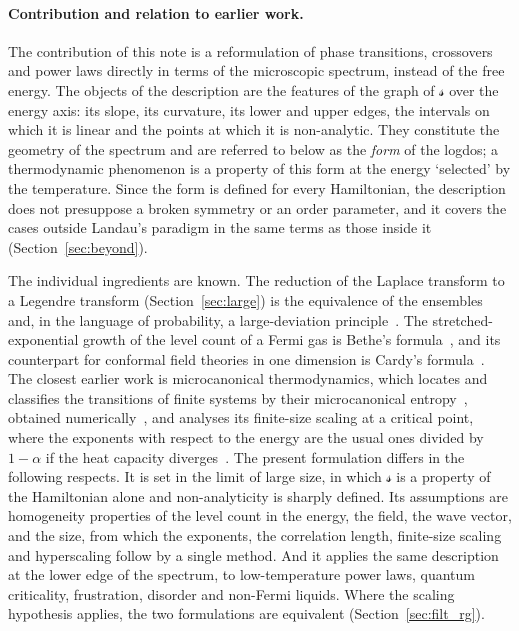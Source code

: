 \documentclass[10pt,a4paper]{article}
\theoremstyle{plain}
\newcommand{\lndos}{{logdos}}  %
\newcommand{\lds}{\mathscr{s}}  %
\begin{document}
\paragraph{Contribution and relation to earlier work.} The contribution of
this note is a reformulation of phase transitions, crossovers and power laws
directly in terms of the microscopic spectrum, instead of the free energy.
The objects of the description are the features of the graph of $\lds$ over
the energy axis: its slope, its curvature, its lower and upper edges, the
intervals on which it is linear and the points at which it is non-analytic.
They constitute the geometry of the spectrum and are referred to below as
the \emph{form} of the \lndos; a
thermodynamic phenomenon is a property of this form at the energy `selected'
by the temperature. Since the form is defined for every Hamiltonian, the
description does not presuppose a broken symmetry or an order parameter, and
it covers the cases outside Landau's paradigm in the same terms as those
inside it (Section~\ref{sec:beyond}).

The individual ingredients are known. The reduction of the Laplace transform
to a Legendre transform (Section~\ref{sec:large}) is the equivalence of the
ensembles~\cite{Schwabl,Ruelle} and, in the language of probability, a
large-deviation principle~\cite{Touchette2009}. The stretched-exponential
growth of the level count of a Fermi gas is Bethe's
formula~\cite{Bethe1936}, and its counterpart for conformal field theories in
one dimension is Cardy's formula~\cite{Cardy1986}. The closest earlier work
is microcanonical thermodynamics, which locates and classifies the
transitions of finite systems by their microcanonical
entropy~\cite{Gross2001,Behringer2006,QiBachmann2018}, obtained
numerically~\cite{WangLandau2001}, and analyses its finite-size scaling at a
critical point, where the exponents with respect to the energy are the usual
ones divided by $1-\alpha$ if the heat capacity
diverges~\cite{Kastner2000}. The present formulation differs in the following
respects. It is set in the limit of large size, in which $\lds$ is a property
of the Hamiltonian alone and non-analyticity is sharply defined. Its
assumptions are homogeneity properties of the level count in the energy, the
field, the wave vector, and the size, from which the exponents, the
correlation length, finite-size scaling and hyperscaling follow by a single
method. And it applies the same description at the lower edge of the
spectrum, to low-temperature power laws, quantum criticality, frustration,
disorder and non-Fermi liquids. Where the scaling hypothesis applies, the
two formulations are equivalent (Section~\ref{sec:filt_rg}).
\end{document}

